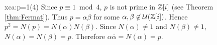 %	
%	
%	

\begin{sol}{xca:p=1(4)}
    Since $p\equiv1\bmod4$, 
    $p$ is not prime in $\mathbb{Z}[i]$ (see Theorem \ref{thm:Fermat}). 
    Thus $p=\alpha\beta$ for some $\alpha,\beta\not\in\mathcal{U}(\mathbb{Z}[i])$. Hence $p^2=N(p)=N(\alpha)N(\beta)$. Since 
    $N(\alpha)\ne 1$ and $N(\beta)\ne 1$, $N(\alpha)=N(\beta)=p$. 
    Therefore $\alpha\overline{\alpha}=N(\alpha)=p$. 
\end{sol}

